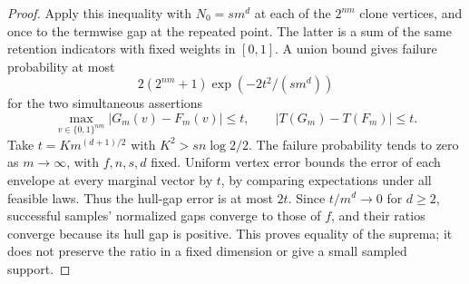 \begin{proof}
Apply this inequality with $N_0=sm^d$ at each of the $2^{nm}$ clone
vertices, and once to the termwise gap at the repeated point. The latter
is a sum of the same retention indicators with fixed weights in $[0,1]$.
A union bound gives failure probability at most
\begin{equation}\label{eq:clone-union-bound}
 2(2^{nm}+1)\exp(-2t^2/(sm^d))
\end{equation}
for the two simultaneous assertions
\[
 \max_{v\in\{0,1\}^{nm}}|G_m(v)-F_m(v)|\le t,
 \qquad |T(G_m)-T(F_m)|\le t.
\]
Take $t=K m^{(d+1)/2}$ with $K^2>sn\log2/2$. The failure probability
tends to zero as $m\to\infty$, with $f,n,s,d$ fixed. Uniform vertex
error bounds the error of each envelope at every marginal vector by $t$,
by comparing expectations under all feasible laws. Thus the hull-gap
error is at most $2t$. Since $t/m^d\to0$ for $d\ge2$, successful samples'
normalized gaps converge to those of $f$, and their ratios converge
because its hull gap is positive. This proves equality of the suprema; it
does not preserve the ratio in a
fixed dimension or give a small sampled support.
\end{proof}
